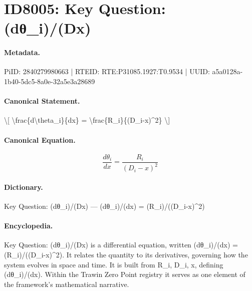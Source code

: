 \section*{ID8005: Key Question: (dθ\_i)/(Dx)}
\paragraph{Metadata.}
PiID: 2840279980663 | RTEID: RTE:P31085.1927:T0.9534 | UUID: a5a0128a-1b40-5dc5-8a0e-32a5e3a28689

\paragraph{Canonical Statement.}
\textbackslash{}[ \textbackslash{}frac\{d\textbackslash{}theta\_i\}\{dx\} = \textbackslash{}frac\{R\_i\}\{(D\_i-x)\textasciicircum{}2\} \textbackslash{}]

\paragraph{Canonical Equation.}
\[
\frac{d\theta_i}{dx} = \frac{R_i}{(D_i-x)^2}
\]

\paragraph{Dictionary.}
Key Question: (dθ\_i)/(Dx) — (dθ\_i)/(dx) = (R\_i)/((D\_i-x)\textasciicircum{}2)

\paragraph{Encyclopedia.}
Key Question: (dθ\_i)/(Dx) is a differential equation, written (dθ\_i)/(dx) = (R\_i)/((D\_i-x)\textasciicircum{}2). It relates the quantity to its derivatives, governing how the system evolves in space and time. It is built from R\_i, D\_i, x, defining (dθ\_i)/(dx). Within the Trawin Zero Point registry it serves as one element of the framework's mathematical narrative.
